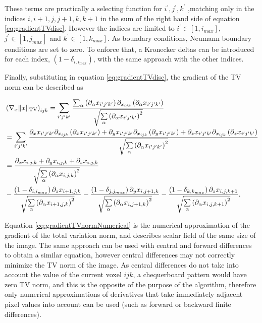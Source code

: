 These terms are practically a selecting function for $i^\prime ,j^\prime ,k^\prime$ ,matching only in the indices $i,i+1,j,j+1,k,k+1$ in the sum of the right hand side of equation \ref{eq:gradientTVdisc}. However the indices are limited to $i^\prime \in [1,i_{max}]$, $j^\prime \in [1,j_{max}]$ and $k^\prime \in [1,k_{max}]$. As boundary conditions, Neumann boundary conditions are set to zero. To enforce that, a Kronecker deltas can be introduced for each index, $\left(1-\delta_{i,i_{max}}\right)$, with the same approach with the other indices.

Finally, substituting in equation \ref{eq:gradientTVdisc}, the gradient of the TV norm can be described as

\begin{align}
&\left(\nabla_x \lVert x \rVert_\text{TV}\right)_{ijk}=\sum\limits_{i^\prime j^\prime k^\prime} \frac{\sum_\alpha\left(\partial_\alpha x_{i^\prime j^\prime k^\prime}\right) \partial_{x_{ijk}} \left(\partial_\alpha x_{i^\prime j^\prime k^\prime}\right)}{\sqrt{\sum\limits_\alpha \left(\partial_\alpha x_{i^\prime j^\prime k^\prime}\right)^2}}\notag\\
&=\sum\limits_{i^\prime j^\prime k^\prime} \frac{\partial_x x_{i^\prime j^\prime k^\prime} \partial_{x_{ijk}} \left(\partial_x x_{i^\prime j^\prime k^\prime}\right) + \partial_y x_{i^\prime j^\prime k^\prime} \partial_{x_{ijk}} \left(\partial_y x_{i^\prime j^\prime k^\prime}\right) + \partial_z x_{i^\prime j^\prime k^\prime} \partial_{x_{ijk}} \left(\partial_z x_{i^\prime j^\prime k^\prime}\right)}{\sqrt{\sum\limits_\alpha \left(\partial_\alpha x_{i^\prime j^\prime k^\prime}\right)^2}}\notag \\
&=\frac{\partial_x x_{i,j,k}+\partial_y x_{i,j,k}+\partial_z x_{i,j,k}}{\sqrt{\sum\limits_\alpha \left(\partial_\alpha x_{i, j, k}\right)^2}}\notag \\
& - \frac{\left(1-\delta_{i,i_{max}}\right) \partial_z x_{i+1,j,k}}{\sqrt{\sum\limits_\alpha \left(\partial_\alpha x_{i+1, j, k}\right)^2}} - \frac{\left(1-\delta_{j,j_{max}}\right) \partial_y x_{i,j+1,k}}{\sqrt{\sum\limits_\alpha \left(\partial_\alpha x_{i, j+1, k}\right)^2}} - \frac{\left(1-\delta_{k,k_{max}}\right) \partial_z x_{i,j,k+1}}{\sqrt{\sum\limits_\alpha \left(\partial_\alpha x_{i, j, k+1}\right)^2}}.\label{eq:gradientTVnormNumerical}
\end{align}

Equation \ref{eq:gradientTVnormNumerical} is the numerical approximation of the gradient of the total variation norm, and describes scalar field of the same size of the image. The same approach can be used with central and forward differences to obtain a similar equation, however central differences may not correctly minimize the TV norm of the image. As central differences do not take into account the value of the current voxel $ijk$, a chequerboard pattern would have zero TV norm, and this is the opposite of the purpose of the algorithm, therefore only numerical approximations of derivatives that take immediately adjacent pixel values into account can be used (such as forward or backward finite differences).

